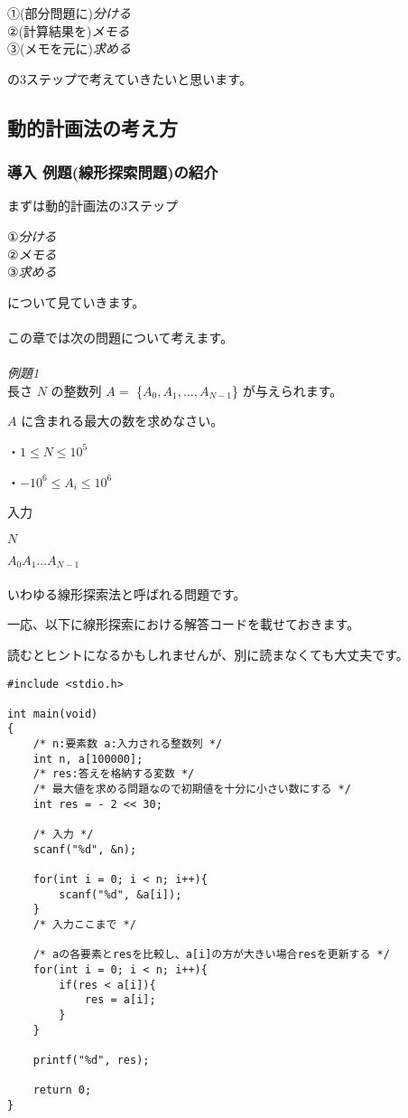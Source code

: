 \noindent
①(部分問題に)\emph{分ける}\\
②(計算結果を)\emph{メモる}\\
③(メモを元に)\emph{求める}

\noindent
の3ステップで考えていきたいと思います。\\

\clearpage

\subsection{動的計画法の考え方}
\subsubsection{導入 例題(線形探索問題)の紹介}

\noindent
まずは動的計画法の3ステップ

\noindent
①\emph{分ける}\\
②\emph{メモる}\\
③\emph{求める}

\noindent
について見ていきます。 
\\ \\
\noindent
この章では次の問題について考えます。\\
\hrulefill \\
\emph{例題1} \\
長さ $N$ の整数列 $A=$ \{$A_0,A_1,...,A_{N-1}$\} が与えられます。

\noindent
$A$ に含まれる最大の数を求めなさい。

\noindent
・$1 \leq N \leq 10^5$

\noindent
・$-10^6 \leq A_i \leq 10^6$

\noindent
入力

\noindent
$N$

\noindent
$A_0 A_1 ... A_{N-1}$\\
\hrulefill \\
いわゆる線形探索法と呼ばれる問題です。

\noindent
一応、以下に線形探索における解答コードを載せておきます。

\noindent
読むとヒントになるかもしれませんが、別に読まなくても大丈夫です。

\clearpage
\noindent
\begin{lstlisting}[style = customC]
#include <stdio.h>

int main(void)
{
    /* n:要素数 a:入力される整数列 */
    int n, a[100000];
    /* res:答えを格納する変数 */
    /* 最大値を求める問題なので初期値を十分に小さい数にする */
    int res = - 2 << 30;

    /* 入力 */
    scanf("%d", &n);

    for(int i = 0; i < n; i++){
        scanf("%d", &a[i]);
    }
    /* 入力ここまで */

    /* aの各要素とresを比較し、a[i]の方が大きい場合resを更新する */
    for(int i = 0; i < n; i++){
        if(res < a[i]){
            res = a[i];
        }
    }

    printf("%d", res);

    return 0;
}
\end{lstlisting}

